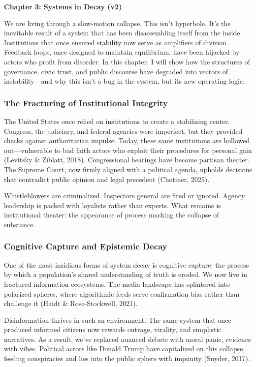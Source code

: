 \textbf{Chapter 3: Systems in Decay (v2)}

We are living through a slow-motion collapse. This isn't hyperbole. It's
the inevitable result of a system that has been disassembling itself
from the inside. Institutions that once ensured stability now serve as
amplifiers of division. Feedback loops, once designed to maintain
equilibrium, have been hijacked by actors who profit from disorder. In
this chapter, I will show how the structures of governance, civic trust,
and public discourse have degraded into vectors of instability---and why
this isn't a bug in the system, but its new operating logic.

\subsubsection{The Fracturing of Institutional
Integrity}\label{the-fracturing-of-institutional-integrity}

The United States once relied on institutions to create a stabilizing
center. Congress, the judiciary, and federal agencies were imperfect,
but they provided checks against authoritarian impulse. Today, these
same institutions are hollowed out---vulnerable to bad faith actors who
exploit their procedures for personal gain (Levitsky \& Ziblatt, 2018).
Congressional hearings have become partisan theater. The Supreme Court,
now firmly aligned with a political agenda, upholds decisions that
contradict public opinion and legal precedent (Chotiner, 2025).

Whistleblowers are criminalized. Inspectors general are fired or
ignored. Agency leadership is packed with loyalists rather than experts.
What remains is institutional theater: the appearance of process masking
the collapse of substance.

\subsubsection{Cognitive Capture and Epistemic
Decay}\label{cognitive-capture-and-epistemic-decay}

One of the most insidious forms of system decay is cognitive capture:
the process by which a population's shared understanding of truth is
eroded. We now live in fractured information ecosystems. The media
landscape has splintered into polarized spheres, where algorithmic feeds
serve confirmation bias rather than challenge it (Haidt \&
Rose-Stockwell, 2021).

Disinformation thrives in such an environment. The same system that once
produced informed citizens now rewards outrage, virality, and simplistic
narratives. As a result, we've replaced nuanced debate with moral panic,
evidence with vibes. Political actors like Donald Trump have capitalized
on this collapse, feeding conspiracies and lies into the public sphere
with impunity (Snyder, 2017).

